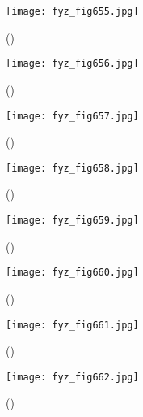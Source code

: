 {    \begin{figure}[ht!] %
      \centering
      \texttt{[image: fyz\_fig655.jpg]}
      \caption{
               (\cite[s.~707]{Feynman02})}
      \label{fyz_fig655}
    \end{figure}

    \begin{figure}[ht!] %
      \centering
      \texttt{[image: fyz\_fig656.jpg]}
      \caption{
               (\cite[s.~707]{Feynman02})}
      \label{fyz_fig656}
    \end{figure}

    \begin{figure}[ht!] %
      \centering
      \texttt{[image: fyz\_fig657.jpg]}
      \caption{
               (\cite[s.~707]{Feynman02})}
      \label{fyz_fig657}
    \end{figure}

    \begin{figure}[ht!] %
      \centering
      \texttt{[image: fyz\_fig658.jpg]}
      \caption{
               (\cite[s.~707]{Feynman02})}
      \label{fyz_fig658}
    \end{figure}

    \begin{figure}[ht!] %
      \centering
      \texttt{[image: fyz\_fig659.jpg]}
      \caption{
               (\cite[s.~707]{Feynman02})}
      \label{fyz_fig659}
    \end{figure}

    \begin{figure}[ht!] %
      \centering
      \texttt{[image: fyz\_fig660.jpg]}
      \caption{
               (\cite[s.~707]{Feynman02})}
      \label{fyz_fig660}
    \end{figure}

    \begin{figure}[ht!] %
      \centering
      \texttt{[image: fyz\_fig661.jpg]}
      \caption{
               (\cite[s.~707]{Feynman02})}
      \label{fyz_fig661}
    \end{figure}

    \begin{figure}[ht!] %
      \centering
      \texttt{[image: fyz\_fig662.jpg]}
      \caption{
               (\cite[s.~707]{Feynman02})}
      \label{fyz_fig662}
    \end{figure}

} %
